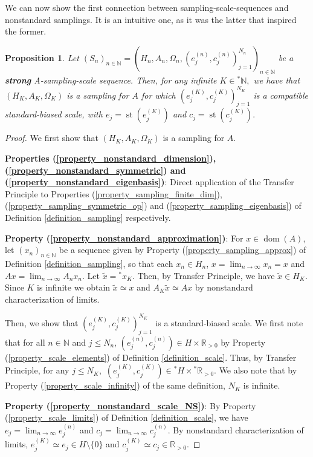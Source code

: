 \documentclass{amsart}
\newtheorem{prop}[thm]{Proposition}
\theoremstyle{definition}
\theoremstyle{remark}
\def \Dom{\operatorname{dom}}
\def \St{\operatorname{st}}
\begin{document}
We can now show the first connection between sampling-scale-sequences and nonstandard samplings. It is an intuitive one, as it was the latter that inspired the former.

\begin{prop}
	Let $(S_n)_{n\in\mathbb{N}}=(H_n,A_n,\Omega_n, (e_j^{(n)},c_j^{(n)})_{j=1}^{N_n})_{n\in\mathbb{N}}$ be a \textbf{strong} A-sampling-scale sequence. Then, for any infinite $K\in{}^*\mathbb{N},$ we have that $(H_K, A_K, \Omega_K)$ is a sampling for $A$ for which $(e_j^{(K)},c_j^{(K)})_{j=1}^{N_K}$ is a compatible standard-biased scale, with $e_j=\St(e_j^{(K)})$ and $c_j=\St(c_j^{(K)}).$
\end{prop}
\begin{proof}
	We first show that $(H_K, A_K, \Omega_K)$ is a sampling for $A$.
	
	\textbf{Properties (\ref{property_nonstandard_dimension}), (\ref{property_nonstandard_symmetric}) and (\ref{property_nonstandard_eigenbasis})}: Direct application of the Transfer Principle to Properties (\ref{property_sampling_finite_dim}),(\ref{property_sampling_symmetric_op}) and (\ref{property_sampling_eigenbasis})  of Definition \ref{definition_sampling} respectively.
	
	\textbf{Property (\ref{property_nonstandard_approximation})}: For $x\in\Dom(A)$, let $(x_n)_{n\in\mathbb{N}}$ be a sequence given by Property (\ref{property_sampling_approx}) of Definition \ref{definition_sampling}, so that each $x_n\in H_n$, $x=\lim_{n\rightarrow\infty}x_n=x$ and $Ax=\lim_{n\rightarrow\infty}A_nx_n.$ Let $\tilde{x}={}^*x_K$. Then, by Transfer Principle, we have $\tilde{x}\in H_K$. Since $K$ is infinite we obtain $\tilde{x}\simeq x$ and $A_K \tilde{x}\simeq Ax$ by nonstandard characterization of limits.
	
	Then, we show that $(e_j^{(K)},c_j^{(K)})_{j=1}^{N_K}$ is a standard-biased scale. We first note that for all $n\in\mathbb{N}$ and $j\leq N_n$, $(e_j^{(n)},c_j^{(n)})\in H\times \mathbb{R}_{>0}$ by Property (\ref{property_scale_elements}) of Definition \ref{definition_scale}. Thus, by Transfer Principle, for any $j\leq N_K,$ $(e_j^{(K)},c_j^{(K)})\in {}^*H\times {}^*\mathbb{R}_{>0}$. We also note that by Property (\ref{property_scale_infinity}) of the same definition, $N_K$ is infinite.
	
	\textbf{Property (\ref{property_nonstandard_scale_NS})}: By Property (\ref{property_scale_limits}) of Definition \ref{definition_scale}, we have $e_j=\lim_{n\rightarrow\infty}e_j^{(n)}$ and $c_j=\lim_{n\rightarrow\infty} c_j^{(n)}.$ By nonstandard characterization of limits, $e_j^{(K)}\simeq e_j\in H\setminus\{0\}$ and $c_j^{(K)}\simeq c_j\in\mathbb{R}_{>0}.$
	

\end{proof}
\end{document}
